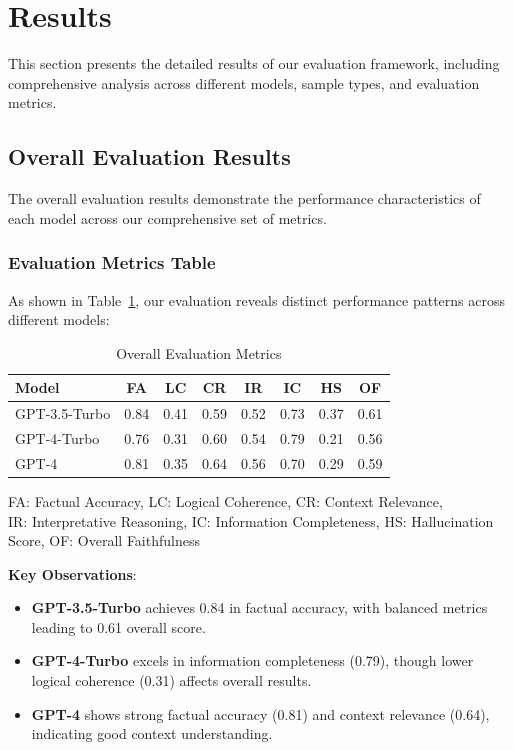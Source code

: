 \section{Results}
This section presents the detailed results of our evaluation framework, including comprehensive analysis across different models, sample types, and evaluation metrics.

\subsection{Overall Evaluation Results}
The overall evaluation results demonstrate the performance characteristics of each model across our comprehensive set of metrics.

\subsubsection{Evaluation Metrics Table}
As shown in Table~\ref{tab:results_overall_metrics}, our evaluation reveals distinct performance patterns across different models:

\begin{table}[!htbp]
\centering
\begin{tabular}{|l|c|c|c|c|c|c|c|}
\hline
\textbf{Model} & \textbf{FA} & \textbf{LC} & \textbf{CR} & \textbf{IR} 
& \textbf{IC} & \textbf{HS} & \textbf{OF} \\
\hline
GPT-3.5-Turbo & 0.84 & 0.41 & 0.59 & 0.52 & 0.73 & 0.37 & 0.61 \\
GPT-4-Turbo & 0.76 & 0.31 & 0.60 & 0.54 & 0.79 & 0.21 & 0.56 \\
GPT-4 & 0.81 & 0.35 & 0.64 & 0.56 & 0.70 & 0.29 & 0.59 \\
\hline
\end{tabular}
\caption{Overall Evaluation Metrics}
\label{tab:results_overall_metrics}
\begin{flushleft}
\small
FA: Factual Accuracy, LC: Logical Coherence, CR: Context Relevance,\\
IR: Interpretative Reasoning, IC: Information Completeness, HS: Hallucination Score, OF: Overall Faithfulness
\end{flushleft}
\end{table}

\textbf{Key Observations}:
\begin{itemize}
    \item \textbf{GPT-3.5-Turbo} achieves 0.84 in factual accuracy, with 
    balanced metrics leading to 0.61 overall score.
    
    \item \textbf{GPT-4-Turbo} excels in information completeness (0.79), 
    though lower logical coherence (0.31) affects overall results.
    
    \item \textbf{GPT-4} shows strong factual accuracy (0.81) and context 
    relevance (0.64), indicating good context understanding.
\end{itemize}

